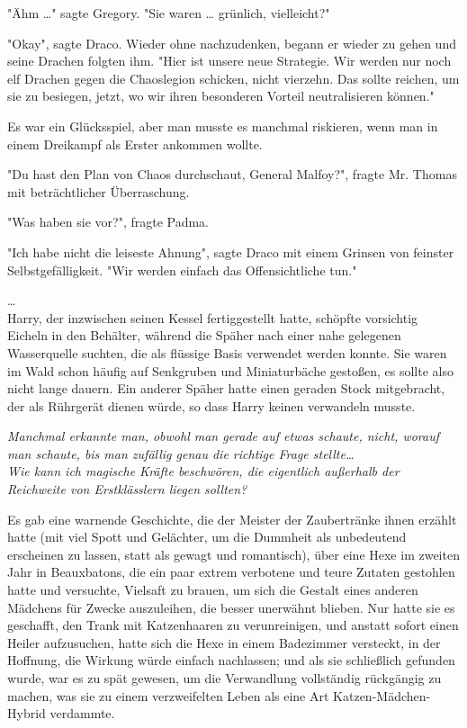 {"Ähm …" sagte Gregory. "Sie waren … grünlich, vielleicht?"

"Okay", sagte Draco. Wieder ohne nachzudenken, begann er wieder zu gehen und seine Drachen folgten ihm. "Hier ist unsere neue Strategie. Wir werden nur noch elf Drachen gegen die Chaoslegion schicken, nicht vierzehn. Das sollte reichen, um sie zu besiegen, jetzt, wo wir ihren besonderen Vorteil neutralisieren können."

Es war ein Glücksspiel, aber man musste es manchmal riskieren, wenn man in einem Dreikampf als Erster ankommen wollte.

"Du hast den Plan von Chaos durchschaut, General Malfoy?", fragte Mr. Thomas mit beträchtlicher Überraschung.

"Was haben sie vor?", fragte Padma.

"Ich habe nicht die leiseste Ahnung", sagte Draco mit einem Grinsen von feinster Selbstgefälligkeit. "Wir werden einfach das Offensichtliche tun."

…\\ Harry, der inzwischen seinen Kessel fertiggestellt hatte, schöpfte vorsichtig Eicheln in den Behälter, während die Späher nach einer nahe gelegenen Wasserquelle suchten, die als flüssige Basis verwendet werden konnte. Sie waren im Wald schon häufig auf Senkgruben und Miniaturbäche gestoßen, es sollte also nicht lange dauern. Ein anderer Späher hatte einen geraden Stock mitgebracht, der als Rührgerät dienen würde, so dass Harry keinen verwandeln musste.

\emph{Manchmal erkannte man, obwohl man gerade auf etwas schaute, nicht, worauf man schaute, bis man zufällig genau die richtige Frage stellte…}\\ \emph{Wie kann ich magische Kräfte beschwören, die eigentlich außerhalb der Reichweite von Erstklässlern liegen sollten?}

Es gab eine warnende Geschichte, die der Meister der Zaubertränke ihnen erzählt hatte (mit viel Spott und Gelächter, um die Dummheit als unbedeutend erscheinen zu lassen, statt als gewagt und romantisch), über eine Hexe im zweiten Jahr in Beauxbatons, die ein paar extrem verbotene und teure Zutaten gestohlen hatte und versuchte, Vielsaft zu brauen, um sich die Gestalt eines anderen Mädchens für Zwecke auszuleihen, die besser unerwähnt blieben. Nur hatte sie es geschafft, den Trank mit Katzenhaaren zu verunreinigen, und anstatt sofort einen Heiler aufzusuchen, hatte sich die Hexe in einem Badezimmer versteckt, in der Hoffnung, die Wirkung würde einfach nachlassen; und als sie schließlich gefunden wurde, war es zu spät gewesen, um die Verwandlung vollständig rückgängig zu machen, was sie zu einem verzweifelten Leben als eine Art Katzen-Mädchen-Hybrid verdammte.

}
